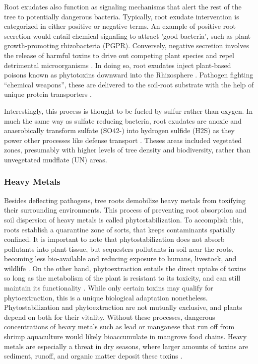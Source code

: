 	
Root exudates also function as signaling mechanisms that alert the rest of the tree to potentially dangerous bacteria. Typically, root exudate intervention is categorized in either positive or negative terms. An example of positive root secretion would entail chemical signaling to attract 'good bacteria', such as plant growth-promoting rhizobacteria (PGPR). Conversely, negative secretion involves the release of harmful toxins to drive out competing plant species and repel detrimental microorganisms \citep{shukla2011nature}. In doing so, root exudates inject plant-based poisons known as phytotoxins downward into the Rhizosphere \citep{shukla2011nature}. Pathogen fighting ``chemical weapons'', these are delivered to the soil-root substrate with the help of unique protein transporters \citep{baetz2014root}.

Interestingly, this process is thought to be fueled by sulfur rather than oxygen. In much the same way as sulfate reducing bacteria, root exudates are anoxic and anaerobically transform sulfate (SO42-) into hydrogen sulfide (H2S) as they power other processes like defense transport \citep{van2002rocks}. Theses areas included vegetated zones, presumably with higher levels of tree density and biodiversity, rather than unvegetated mudflate (UN) areas.

\subsubsection{Heavy Metals}

  Besides deflecting pathogens, tree roots demobilize heavy metals from toxifying their surrounding environments. This process of preventing root absorption and soil dispersion of heavy metals is called phytostabilization. To accomplish this, roots establish a quarantine zone of sorts, that keeps contaminants spatially confined. It is important to note that phytostabilization does not absorb pollutants into plant tissue, but sequesters pollutants in soil near the roots, becoming less bio-available and reducing exposure to humans, livestock, and wildlife \citep{deBashana2012ThePC}. On the other hand, phytoextraction entails the direct uptake of toxins so long as the metabolism of the plant is resistant to its toxicity, and can still maintain its functionality \citep{mccutcheon2003overview}. While only certain toxins may qualify for phytoextraction, this is a unique biological adaptation nonetheless. Phytostabilization and phytoextraction are not mutually exclusive, and plants depend on both for their vitality. Without these processes, dangerous concentrations of heavy metals such as lead or manganese that run off from shrimp aquaculture would likely bioaccumulate in mangrove food chains. Heavy metals are especially a threat in dry seasons, where larger amounts of toxins are sediment, runoff, and organic matter deposit these toxins \citep{handayani2015migration}.  


